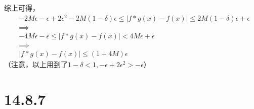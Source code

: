 \documentclass{article}
\begin{document}
\begin{itemize}
        综上可得，
        \begin{align*}
           & -2M\epsilon - \epsilon + 2\epsilon^2 -2M(1-\delta)\epsilon \leq |f \ast g(x) - f(x)| \leq 2M(1-\delta)\epsilon + \epsilon \\
           & \implies                                                                                                                  \\
           & -4M\epsilon - \epsilon \leq |f \ast g(x) - f(x)| < 4M\epsilon + \epsilon                                                  \\
           & \implies                                                                                                                  \\
           & |f \ast g(x) - f(x)| \leq (1 + 4M)\epsilon
        \end{align*}
        （注意，以上用到了$1 - \delta < 1, - \epsilon + 2\epsilon^2 > -\epsilon$）

\end{itemize}

\section*{14.8.7}
\end{document}
